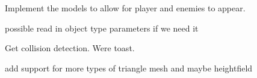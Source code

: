 
\begin{DoxyRefList}
\item[\label{todo__todo000001}%
\hypertarget{todo__todo000001}{}%
Class \hyperlink{classgraphics_1_1_graphics_engine}{graphics\+:\+:Graphics\+Engine} ]Implement the models to allow for player and enemies to appear.  
\item[\label{todo__todo000002}%
\hypertarget{todo__todo000002}{}%
Class \hyperlink{classlua___script_1_1h}{lua\+\_\+\+Script\+:\+:h} ]possible read in object type parameters if we need it  
\item[\label{todo__todo000003}%
\hypertarget{todo__todo000003}{}%
Class \hyperlink{class_main_game}{Main\+Game} ]Get collision detection. We\textquotesingle{}re toast. 
\item[\label{todo__todo000004}%
\hypertarget{todo__todo000004}{}%
Class \hyperlink{class_physiscs___wrapper_1_1h}{Physiscs\+\_\+\+Wrapper\+:\+:h} ]add support for more types of triangle mesh and maybe heightfield 
\end{DoxyRefList}